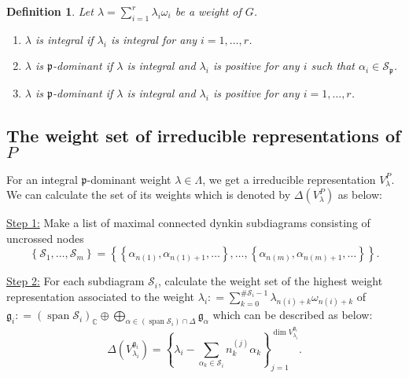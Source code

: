 \documentclass[uplatex,dvipdfmx]{jsarticle}
\newtheorem{definition}{Definition}[section]
\newcommand{\defeq}{\mathrel{\mathop:}=}
\begin{document}
\begin{definition}
    Let 
    $\lambda = \sum_{i = 1}^r \lambda_i \omega_i$ 
    be a weight of
    $G$.
    \begin{enumerate}
        \item
            $\lambda$
            is
            \textit{integral} 
            if
            $\lambda_i$
            is integral for any
            $i = 1, \ldots, r$.
        \item 
            $\lambda$
            is
            $\mathfrak{p}$\textit{-dominant} 
            if
            $\lambda$
            is integral and
            $\lambda_i$
            is positive for any
            $i$
            such that
            $\alpha_i \in \mathcal{S}_\mathfrak{p}$.
        \item 
            $\lambda$
            is
            $\mathfrak{p}$\textit{-dominant} 
            if
            $\lambda$
            is integral and
            $\lambda_i$
            is positive for any
            $i = 1, \ldots, r$.
    \end{enumerate}
\end{definition}

\subsection{The weight set of irreducible representations of $P$}

For an integral
$\mathfrak{p}$-dominant
weight
$\lambda \in \Lambda$,
we get a irreducible representation
$V_\lambda^P$.
We can calculate the set of its weights which is denoted by
$\Delta(V_\lambda^P)$ as below:

\underline{Step 1:}
Make a list of maximal connected dynkin subdiagrams consisting of uncrossed nodes
\begin{equation}
    \left\{ 
        \mathcal{S}_1, 
        \ldots, 
        \mathcal{S}_m 
    \right\}
    =
    \left\{
        \left\{ \alpha_{n(1)}, \alpha_{n(1)+1}, \ldots \right\},
        \ldots, 
        \left\{ \alpha_{n(m)}, \alpha_{n(m)+1}, \ldots \right\} 
    \right\}.
\end{equation}

\underline{Step 2:}
For each subdiagram 
$\mathcal{S}_i$, 
calculate the weight set of the highest weight representation
associated to the weight
$\lambda_i 
\defeq
\sum_{k = 0}^{\# \mathcal{S}_i - 1}
\lambda_{n(i) + k} \omega_{n(i) + k}$
of 
$\mathfrak{g}_i
\defeq
(\operatorname{span} \mathcal{S}_i)_\mathbb{C} 
\oplus 
\bigoplus_{\alpha \in (\operatorname{span} \mathcal{S}_i)\cap \Delta}
\mathfrak{g}_\alpha$ which can be described as below:
\begin{equation}
    \Delta\left( 
        V
        ^{\mathfrak{g}_i}
        _{\lambda_i}
    \right)
    =
    \left\{ 
        \lambda_i - \sum_{\alpha_k \in \mathcal{S}_i} n_k^{(j)} \alpha_k
    \right\}
    _{j = 1}
    ^{\operatorname{dim}
        V
        ^{\mathfrak{g}_i}
        _{\lambda_i}}.
\end{equation}
\end{document}
